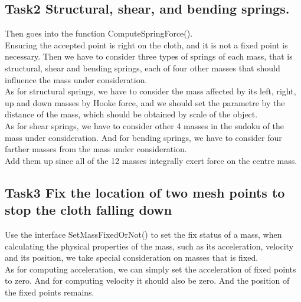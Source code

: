 \documentclass[acmtog]{acmart}
\begin{document}
\subsection{Task2 Structural, shear, and bending springs.}
Then goes into the function ComputeSpringForce().\\
Ensuring the accepted point is right on the cloth, and it is not a fixed point is necessary. Then we have to consider three types of springs of each mass, that is structural, shear and bending springs, each of four other masses that should influence the mass under consideration.\\
As for structural springs, we have to consider the mass affected by its left, right, up and down masses by Hooke force, and we should set the parametre by the distance of the mass, which should be obtained by scale of the object.\\
As for shear springs, we have to consider other 4 masses in the sudoku of the mass under consideration. And for bending springs, we have to consider four farther masses from the mass under consideration.\\
Add them up since all of the 12 masses integrally exert force on the centre mass.

\subsection{Task3 Fix the location of two mesh points to stop the cloth falling down}
Use the interface SetMassFixedOrNot() to set the fix status of a mass, when calculating the physical properties of the mass, such as its acceleration, velocity and its position, we take special consideration on masses that is fixed.\\
As for computing acceleration, we can simply set the acceleration of fixed points to zero. And for computing velocity it should also be zero. And the position of the fixed points remains.
\end{document}
